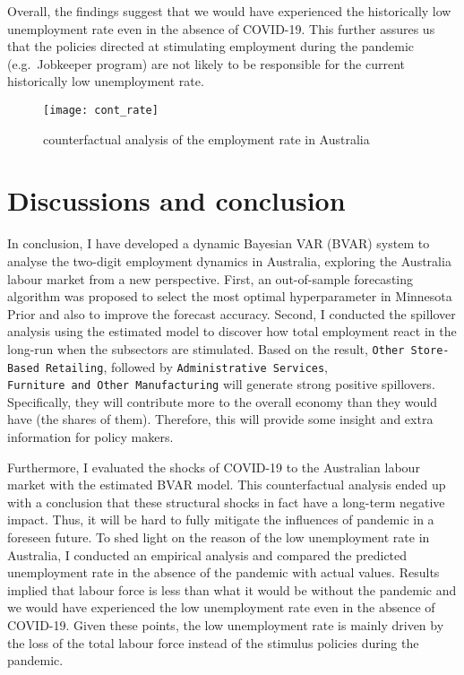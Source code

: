 \documentclass{monashthesis}
\begin{document}
Overall, the findings suggest that we would have experienced the historically low unemployment rate even in the absence of COVID-19. This further assures us that the policies directed at stimulating employment during the pandemic (e.g.~Jobkeeper program) are not likely to be responsible for the current historically low unemployment rate.

\begin{figure}[H]
\texttt{[image: cont\_rate]}
\centering
\caption{counterfactual analysis of the employment rate in Australia}
\label{fig:unrate}
\end{figure}

\clearpage

\hypertarget{discussions-and-conclusion}{%
\chapter{Discussions and conclusion}\label{discussions-and-conclusion}}

In conclusion, I have developed a dynamic Bayesian VAR (BVAR) system to analyse the two-digit employment dynamics in Australia, exploring the Australia labour market from a new perspective. First, an out-of-sample forecasting algorithm was proposed to select the most optimal hyperparameter in Minnesota Prior and also to improve the forecast accuracy. Second, I conducted the spillover analysis using the estimated model to discover how total employment react in the long-run when the subsectors are stimulated. Based on the result, \texttt{Other\ Store-Based\ Retailing}, followed by \texttt{Administrative\ Services}, \texttt{Furniture\ and\ Other\ Manufacturing} will generate strong positive spillovers. Specifically, they will contribute more to the overall economy than they would have (the shares of them). Therefore, this will provide some insight and extra information for policy makers.

Furthermore, I evaluated the shocks of COVID-19 to the Australian labour market with the estimated BVAR model. This counterfactual analysis ended up with a conclusion that these structural shocks in fact have a long-term negative impact. Thus, it will be hard to fully mitigate the influences of pandemic in a foreseen future. To shed light on the reason of the low unemployment rate in Australia, I conducted an empirical analysis and compared the predicted unemployment rate in the absence of the pandemic with actual values. Results implied that labour force is less than what it would be without the pandemic and we would have experienced the low unemployment rate even in the absence of COVID-19. Given these points, the low unemployment rate is mainly driven by the loss of the total labour force instead of the stimulus policies during the pandemic.
\end{document}
